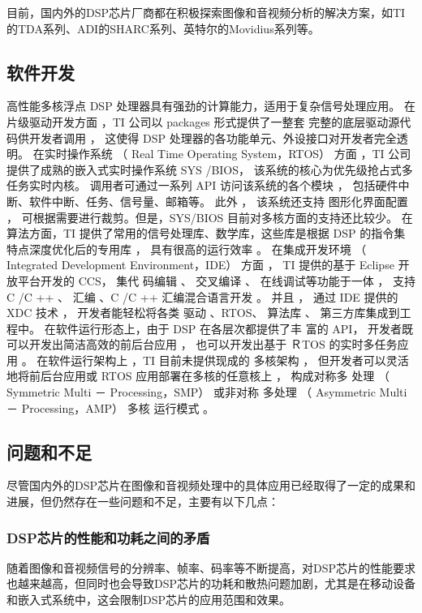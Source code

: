 \documentclass{math201}
\begin{document}
目前，国内外的DSP芯片厂商都在积极探索图像和音视频分析的解决方案，如TI的TDA系列、ADI的SHARC系列、英特尔的Movidius系列等。

\subsection{软件开发}

高性能多核浮点 DSP 处理器具有强劲的计算能力，适用于复杂信号处理应用。\cite{DZDK202301011}
在片级驱动开发方面 ，TI 公司以 packages 形式提供了一整套 完整的底层驱动源代码供开发者调用 ， 这使得 DSP 处理器的各功能单元、外设接口对开发者完全透明。
在实时操作系统 （ Real Time  Operating System，RTOS） 方面 ，TI 公司提供了成熟的嵌入式实时操作系统 SYS /BIOS， 该系统的核心为优先级抢占式多任务实时内核。
调用者可通过一系列 API 访问该系统的各个模块 ， 包括硬件中断、软件中断、任务、信号量、邮箱等。
此外 ， 该系统还支持 图形化界面配置 ， 可根据需要进行裁剪。但是，SYS/BIOS 目前对多核方面的支持还比较少。
在算法方面，TI 提供了常用的信号处理库、数学库，这些库是根据 DSP 的指令集特点深度优化后的专用库 ， 具有很高的运行效率 。 在集成开发环境 （ Integrated Development Environment，IDE） 方面 ， TI 提供的基于 Eclipse 开放平台开发的 CCS， 集代 码编辑 、 交叉编译 、 在线调试等功能于一体 ， 支持 C /C ++ 、 汇编 、C /C ++ 汇编混合语言开发 。
并且 ， 通过 IDE 提供的 XDC 技术 ， 开发者能轻松将各类 驱动 、RTOS、 算法库 、 第三方库集成到工程中。
在软件运行形态上，由于 DSP 在各层次都提供了丰 富的 API， 开发者既可以开发出简洁高效的前后台应用 ， 也可以开发出基于 ＲTOS 的实时多任务应用 。 在软件运行架构上 ，TI 目前未提供现成的 多核架构 ， 但开发者可以灵活地将前后台应用或 RTOS 应用部署在多核的任意核上 ， 构成对称多 处理 （ Symmetric Multi － Processing，SMP） 或非对称 多处理 （ Asymmetric Multi － Processing，AMP） 多核 运行模式 。

\subsection{问题和不足}

尽管国内外的DSP芯片在图像和音视频处理中的具体应用已经取得了一定的成果和进展，但仍然存在一些问题和不足，主要有以下几点：

\subsubsection{DSP芯片的性能和功耗之间的矛盾}

随着图像和音视频信号的分辨率、帧率、码率等不断提高，对DSP芯片的性能要求也越来越高，但同时也会导致DSP芯片的功耗和散热问题加剧，尤其是在移动设备和嵌入式系统中，这会限制DSP芯片的应用范围和效果。
\end{document}
